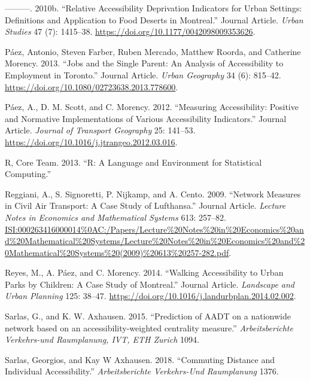 \documentclass[]{elsarticle} %
\begin{document}
\leavevmode\hypertarget{ref-Paez2010fooddeserts}{}%
---------. 2010b. ``Relative Accessibility Deprivation Indicators for
Urban Settings: Definitions and Application to Food Deserts in
Montreal.'' Journal Article. \emph{Urban Studies} 47 (7): 1415--38.
\url{https://doi.org/10.1177/0042098009353626}.

\leavevmode\hypertarget{ref-Paez2013jobs}{}%
Páez, Antonio, Steven Farber, Ruben Mercado, Matthew Roorda, and
Catherine Morency. 2013. ``Jobs and the Single Parent: An Analysis of
Accessibility to Employment in Toronto.'' Journal Article. \emph{Urban
Geography} 34 (6): 815--42.
\url{https://doi.org/10.1080/02723638.2013.778600}.

\leavevmode\hypertarget{ref-Paez2012positive}{}%
Páez, A., D. M. Scott, and C. Morency. 2012. ``Measuring Accessibility:
Positive and Normative Implementations of Various Accessibility
Indicators.'' Journal Article. \emph{Journal of Transport Geography} 25:
141--53. \url{https://doi.org/10.1016/j.jtrangeo.2012.03.016}.

\leavevmode\hypertarget{ref-Rcore}{}%
R, Core Team. 2013. ``R: A Language and Environment for Statistical
Computing.''

\leavevmode\hypertarget{ref-Reggiani2009network}{}%
Reggiani, A., S. Signoretti, P. Nijkamp, and A. Cento. 2009. ``Network
Measures in Civil Air Transport: A Case Study of Lufthansa.'' Journal
Article. \emph{Lecture Notes in Economics and Mathematical Systems} 613:
257--82.
\url{ISI:000263416000014\%0AC:/Papers/Lecture\%20Notes\%20in\%20Economics\%20and\%20Mathematical\%20Systems/Lecture\%20Notes\%20in\%20Economics\%20and\%20Mathematical\%20Systems\%20(2009)\%20613\%20257-282.pdf}.

\leavevmode\hypertarget{ref-Reyes2014}{}%
Reyes, M., A. Páez, and C. Morency. 2014. ``Walking Accessibility to
Urban Parks by Children: A Case Study of Montreal.'' Journal Article.
\emph{Landscape and Urban Planning} 125: 38--47.
\url{https://doi.org/10.1016/j.landurbplan.2014.02.002}.

\leavevmode\hypertarget{ref-Sarlas2015}{}%
Sarlas, G., and K. W. Axhausen. 2015. ``Prediction of AADT on a
nationwide network based on an accessibility-weighted centrality
measure.'' \emph{Arbeitsberichte Verkehrs-und Raumplanung, IVT, ETH
Zurich} 1094.

\leavevmode\hypertarget{ref-Sarlas2019}{}%
Sarlas, Georgios, and Kay W Axhausen. 2018. ``Commuting Distance and
Individual Accessibility.'' \emph{Arbeitsberichte Verkehrs-Und
Raumplanung} 1376.
\end{document}

